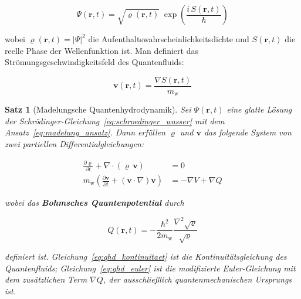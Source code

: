 ﻿\documentclass[12pt,a4paper]{report}
\newtheorem{theorem}{Satz}[chapter]
\begin{document}
\begin{equation}
	\Psi(\mathbf{r},t) = \sqrt{\varrho(\mathbf{r},t)}\;\exp\!\left(\frac{i\,S(\mathbf{r},t)}{\hbar}\right)
	\label{eq:madelung_ansatz}
\end{equation}

wobei $\varrho(\mathbf{r},t) = |\Psi|^2$ die Aufenthaltswahrscheinlichkeitsdichte und $S(\mathbf{r},t)$ die reelle Phase der Wellenfunktion ist. Man definiert das Strömungsgeschwindigkeitsfeld des Quantenfluids:

\begin{equation}
	\mathbf{v}(\mathbf{r},t) = \frac{\nabla S(\mathbf{r},t)}{m_\mathrm{w}}
	\label{eq:geschwindigkeit_phase}
\end{equation}

\begin{theorem}[Madelungsche Quantenhydrodynamik]
	\label{thm:madelung}
	Sei $\Psi(\mathbf{r},t)$ eine glatte Lösung der Schrödinger-Gleichung~\eqref{eq:schroedinger_wasser} mit dem Ansatz~\eqref{eq:madelung_ansatz}. Dann erfüllen $\varrho$ und $\mathbf{v}$ das folgende System von zwei partiellen Differentialgleichungen:
	
	\begin{align}
		\frac{\partial \varrho}{\partial t} + \nabla \cdot (\varrho\,\mathbf{v}) &= 0 \label{eq:qhd_kontinuitaet}\\[6pt]
		m_\mathrm{w}\left(\frac{\partial \mathbf{v}}{\partial t} + (\mathbf{v}\cdot\nabla)\mathbf{v}\right) &= -\nabla V + \nabla Q \label{eq:qhd_euler}
	\end{align}
	
	wobei das \textbf{Bohmsches Quantenpotential} durch
	
	\begin{equation}
		Q(\mathbf{r},t) = -\frac{\hbar^2}{2m_\mathrm{w}} \frac{\nabla^2\sqrt{\varrho}}{\sqrt{\varrho}}
		\label{eq:quantenpotential}
	\end{equation}
	
	definiert ist. Gleichung~\eqref{eq:qhd_kontinuitaet} ist die Kontinuitätsgleichung des Quantenfluids; Gleichung~\eqref{eq:qhd_euler} ist die modifizierte Euler-Gleichung mit dem zusätzlichen Term $\nabla Q$, der ausschließlich quantenmechanischen Ursprungs ist.
\end{theorem}
\end{document}
